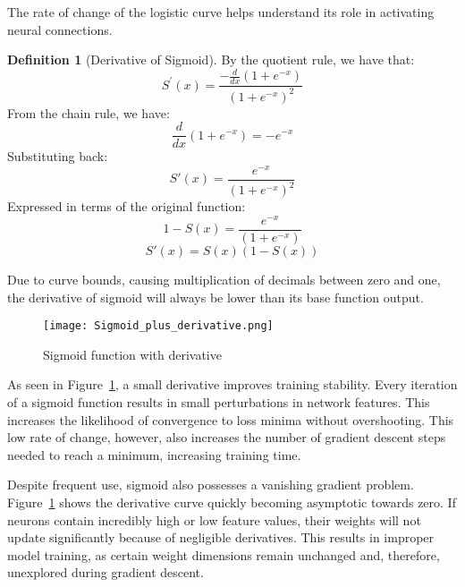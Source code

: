 \documentclass{article}
\theoremstyle{definition}
\newtheorem{definition}{Definition}[section]
\begin{document}
The rate of change of the logistic curve helps understand its role in activating neural connections.
\begin{definition}[Derivative of Sigmoid]
    By the quotient rule, we have that:
    \[
        S^{'}(x)=\frac{-\frac{d}{dx} (1+e^{-x})}{(1+e^{-x})^2}
    \]
    From the chain rule, we have:
    \[
        \frac{d}{dx} (1+e^{-x})= -e^{-x}
    \]
    Substituting back:
    \[
        S'(x)=\frac{e^{-x}}{(1+e^{-x})^2}
    \]
    Expressed in terms of the original function:
    \[
        1-S(x) = \frac{e^{-x}}{(1+e^{-x})}
    \]
    \[
        S'(x) = S(x)(1-S(x))
    \]
\end{definition}
Due to curve bounds, causing multiplication of decimals between zero and one, the derivative of sigmoid will always be lower than its base function output.
\begin{figure}[H]
    \centering
    \texttt{[image: Sigmoid\_plus\_derivative.png]}
    \caption{Sigmoid function with derivative
    }
    \label{fig:Figure 4}
\end{figure}
As seen in Figure~\ref{fig:Figure 4}, a small derivative improves training stability. Every iteration of a sigmoid function results in small perturbations in network features. This increases the likelihood of convergence to loss minima without overshooting. This low rate of change, however, also increases the number of gradient descent steps needed to reach a minimum, increasing training time. 

Despite frequent use, sigmoid also possesses a vanishing gradient problem. Figure~\ref{fig:Figure 4} shows the derivative curve quickly becoming asymptotic towards zero. If neurons contain incredibly high or low feature values, their weights will not update significantly because of negligible derivatives. This results in improper model training, as certain weight dimensions remain unchanged and, therefore, unexplored during gradient descent.
\end{document}
